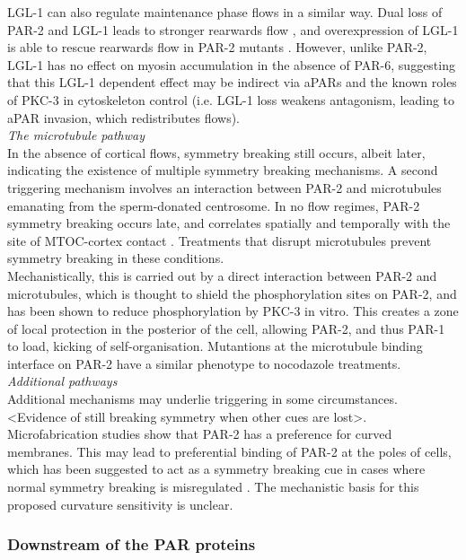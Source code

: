 \documentclass[12pt]{"article"}
\begin{document}
LGL-1 can also regulate maintenance phase flows in a similar way. Dual loss of PAR-2 and LGL-1 leads to stronger rearwards flow \citep{Beatty2010}, and overexpression of LGL-1 is able to rescue rearwards flow in PAR-2 mutants \citep{Hoege2010}. However, unlike PAR-2, LGL-1 has no effect on myosin accumulation in the absence of PAR-6, suggesting that this LGL-1 dependent effect may be indirect via aPARs and the known roles of PKC-3 in cytoskeleton control (i.e. LGL-1 loss weakens antagonism, leading to aPAR invasion, which redistributes flows).\\

\textit{The microtubule pathway}\\

In the absence of cortical flows, symmetry breaking still occurs, albeit later, indicating the existence of multiple symmetry breaking mechanisms. A second triggering mechanism involves an interaction between PAR-2 and microtubules emanating from the sperm-donated centrosome. In no flow regimes, PAR-2 symmetry breaking occurs late, and correlates spatially and temporally with the site of MTOC-cortex contact \citep{Motegi2011}. Treatments that disrupt microtubules prevent symmetry breaking in these conditions.\\

Mechanistically, this is carried out by a direct interaction between PAR-2 and microtubules, which is thought to shield the phosphorylation sites on PAR-2, and has been shown to reduce phosphorylation by PKC-3 in vitro. This creates a zone of local protection in the posterior of the cell, allowing PAR-2, and thus PAR-1 to load, kicking of self-organisation. Mutantions at the microtubule binding interface on PAR-2 have a similar phenotype to nocodazole treatments.\\

\textit{Additional pathways}\\

Additional mechanisms may underlie triggering in some circumstances. <Evidence of still breaking symmetry when other cues are lost>. Microfabrication studies show that PAR-2 has a preference for curved membranes. This may lead to preferential binding of PAR-2 at the poles of cells, which has been suggested to act as a symmetry breaking cue in cases where normal symmetry breaking is misregulated \citep{Klinkert2019}. The mechanistic basis for this proposed curvature sensitivity is unclear.\\


\subsubsection{Downstream of the PAR proteins}
\end{document}
